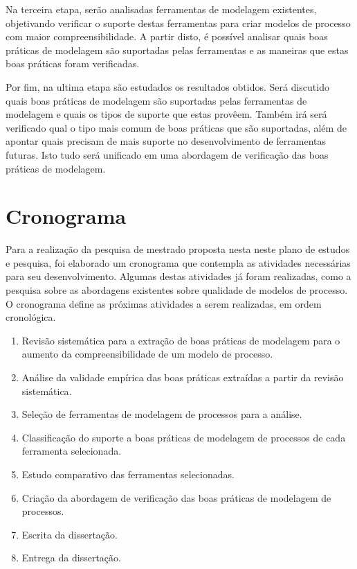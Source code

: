 \documentclass[12pt]{article}
\begin{document}
Na terceira etapa, serão analisadas ferramentas de modelagem existentes, objetivando verificar o suporte destas ferramentas para criar modelos de processo com maior compreensibilidade. A partir disto, é possível analisar quais boas práticas de modelagem são suportadas pelas ferramentas e as maneiras que estas boas práticas foram verificadas.

Por fim, na ultima etapa são estudados os resultados obtidos. Será discutido quais boas práticas de modelagem são suportadas pelas ferramentas de modelagem e quais os tipos de suporte que estas provêem. Também irá será verificado qual o tipo mais comum de boas práticas que são suportadas, além de apontar quais precisam de mais suporte no desenvolvimento de ferramentas futuras. Isto tudo será unificado em uma abordagem de verificação das boas práticas de modelagem.


\section{Cronograma}

Para a realização da pesquisa de mestrado proposta nesta neste plano de estudos e pesquisa, foi elaborado um cronograma que contempla as atividades necessárias para seu desenvolvimento. Algumas destas atividades já foram realizadas, como a pesquisa sobre as abordagens existentes sobre qualidade de modelos de processo. O cronograma define as próximas atividades a serem realizadas, em ordem cronológica.

\begin{enumerate}
	\item Revisão sistemática para a extração de boas práticas de modelagem para o aumento da compreensibilidade de um modelo de processo.
	\item Análise da validade empírica das boas práticas extraídas a partir da revisão sistemática.
	\item Seleção de ferramentas de modelagem de processos para a análise.
	\item Classificação do suporte a boas práticas de modelagem de processos de cada ferramenta selecionada.
	\item Estudo comparativo das ferramentas selecionadas.
	\item Criação da abordagem de verificação das boas práticas de modelagem de processos.
	\item Escrita da dissertação.
	\item Entrega da dissertação.
\end{enumerate}

\newpage


\end{document}
